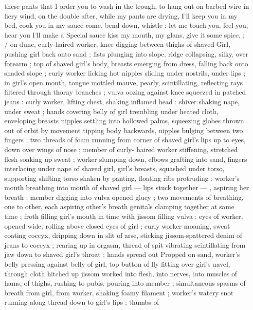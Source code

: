 these pants that I order you to wash in the trough, to hang out on 
barbed wire in fiery wind, on the double{\thd} after, while my pants are 
drying, I'll keep you in my bed, cook you in my sauce{\td} come, bend 
down, whistle : let me touch you, feel you, hear you{\thd} I'll make a 
Special sauce{\td} kiss my mouth, my glans, give it some spice.{\gr} ; {\slash} on 
dune, curly-haired worker, knee digging between thighs of shaved 
Girl, pushing girl back onto sand ; fists plunging into slope, ridge 
collapsing, silky, over forearm ; top of shaved girl's body, breasts 
emerging from dress, falling back onto shaded slope ; curly worker 
licking hot nipples sliding under nostrils, under lips ; in girl's open 
mouth, tongue mottled mauve, pearly, scintillating, reflecting rays 
filtered through thorny branches ; vulva oozing against knee 
squeezed in patched jeans : curly worker, lifting chest, shaking 
inflamed head : shiver shaking nape, under sweat ; hands covering 
belly of girl trembling under heated cloth, enveloping breasts 
nipples settling into hollowed palms, squeezing globes thrown out of 
orbit by movement tipping body backwards, nipples bulging between 
two fingers ; two threads of foam running from corner of shaved 
girl's lips up to eyes, down over wings of nose ; member of curly- 
haired worker stiffening, stretched flesh soaking up sweat ; worker 
slumping down, elbows grafting into sand, fingers interlacing under 
nape of shaved girl, girl's breasts, squashed under torso, supporting 
shifting torso shaken by panting, floating ribs protruding ; worker's 
mouth breathing into mouth of shaved girl --- lips stuck together --- 
, aspiring her breath : member digging into vulva opened gluey ; two 
movements of breathing, one to other, each aspiring other's breath 
genitals clamping together at same time ; froth filling girl's mouth in 
time with jissom filling vulva ; eyes of worker, opened wide, rolling 
above closed eyes of girl ; curly worker moaning, sweat coating 
coccyx, dripping down in slit of arse, sticking jissom-spattered denim 
of jeans to coccyx ; rearing up in orgasm, thread of spit vibrating 
scintillating from jaw down to shaved girl's throat ; hands spread out 
Propped on sand, worker's belly pressing against belly of girl, top 
button of fly fitting over girl's navel, through cloth hitched up 
jissom worked into flesh, into nerves, into muscles of hams, of 
thighs, rushing to pubis, pouring into member ; simultaneous spasms 
of breath from girl, from worker, shaking foamy filament ; worker's 
watery snot running along thread down to girl's lips ; thumbs of 

